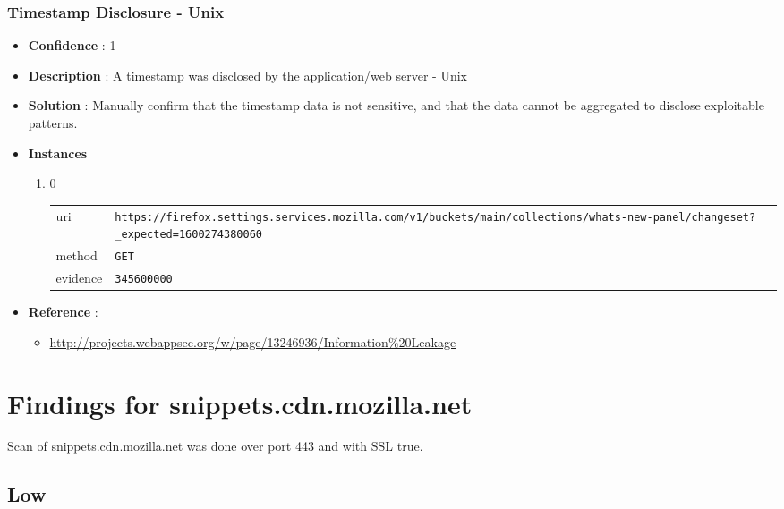 \documentclass[10pt]{article}
\begin{document}
\subsubsection{Timestamp Disclosure - Unix}
\begin{itemize}
\item[] \textbf{Confidence} : 1
\item[] \textbf{Description} : A timestamp was disclosed by the application/web server - Unix
\item[] \textbf{Solution} :  Manually confirm that the timestamp data is not sensitive, and that the data cannot be aggregated to disclose exploitable patterns.
\item[] \textbf{Instances}
\begin{enumerate}
\item[] 0
\begin{tabular}{| l | p{12cm}}
uri & \texttt{https://firefox.settings.services.mozilla.com/v1/buckets/main/collections/whats-new-panel/changeset?\_expected=1600274380060} \\
method & \texttt{GET} \\
evidence & \texttt{345600000} \\
\end{tabular}
\end{enumerate}
\item[] \textbf{Reference} : 
\begin{itemize}
\item \url{http://projects.webappsec.org/w/page/13246936/Information\%20Leakage}
\end{itemize}
\end{itemize}
\section{Findings for snippets.cdn.mozilla.net}
Scan of snippets.cdn.mozilla.net was done over port 443 and with SSL true.
\subsection{Low}
\end{document}
